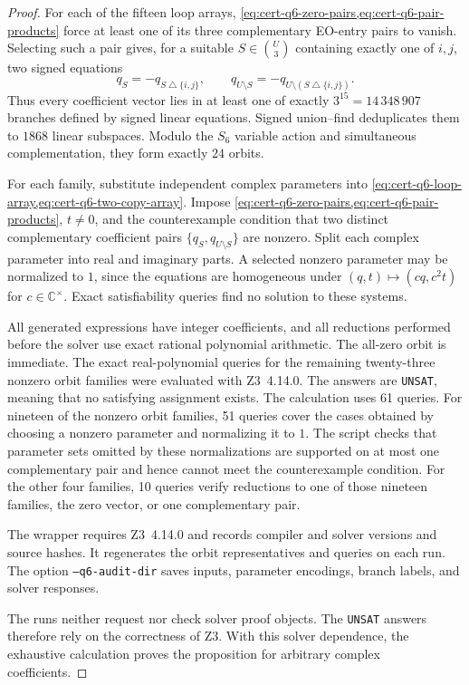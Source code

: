 \documentclass[11pt,letterpaper,onecolumn]{article}
\theoremstyle{plain}
\theoremstyle{definition}
\theoremstyle{remark}
\begin{document}
	\begin{proof}

For each of the fifteen loop arrays,
		\cref{eq:cert-q6-zero-pairs,eq:cert-q6-pair-products} force at least one
		of its three complementary EO-entry pairs to vanish.  Selecting such a
		pair gives, for a suitable \(S\in\binom U3\) containing exactly one of
		\(i,j\), two signed equations
		\begin{equation*}
			q_S=-q_{S\mathbin\triangle\{i,j\}},
			\qquad
			q_{U\setminus S}=-q_{U\setminus(S\mathbin\triangle\{i,j\})}.
		\end{equation*}
		Thus every coefficient vector lies in at least one of exactly
		\(3^{15}=14\,348\,907\) branches defined by signed linear equations.  Signed
		union--find deduplicates them to \(1868\) linear subspaces. Modulo the \(S_6\) variable action
		and simultaneous complementation, they form exactly \(24\) orbits.
		
        For each family, substitute independent complex parameters into
        \cref{eq:cert-q6-loop-array,eq:cert-q6-two-copy-array}. Impose
        \cref{eq:cert-q6-zero-pairs,eq:cert-q6-pair-products}, \(t\ne0\),
        and the counterexample condition that two distinct complementary
        coefficient pairs \(\{q_S,q_{U\setminus S}\}\) are nonzero.
        Split each complex parameter into real and imaginary parts.
        A selected nonzero parameter may be normalized to \(1\), since
        the equations are homogeneous under
        \((q,t)\mapsto(cq,c^2t)\) for \(c\in\mathbb C^\times\).
        Exact satisfiability queries find no solution to these systems.
		
		All generated expressions have integer coefficients, and all reductions
		performed before the solver use exact rational polynomial arithmetic.  The
		all-zero orbit is immediate.
		The exact real-polynomial queries for the remaining twenty-three nonzero
		orbit families were evaluated with Z3~4.14.0.  The answers are
		\texttt{UNSAT}, meaning that no satisfying assignment exists. The
		calculation uses 61 queries. For nineteen of the nonzero orbit families,
		51 queries cover the cases obtained by choosing a nonzero parameter and
		normalizing it to \(1\). The script checks that parameter sets omitted by
		these normalizations are supported on at most one complementary pair and
		hence cannot meet the counterexample condition. For the other four families,
		10 queries verify reductions to one of those nineteen families, the zero
		vector, or one complementary pair.
		
        The wrapper requires Z3~4.14.0 and records compiler and solver
        versions and source hashes. It regenerates the orbit representatives
        and queries on each run. The option \texttt{--q6-audit-dir} saves
        inputs, parameter encodings, branch labels, and solver responses.

		The runs neither request nor check solver proof objects.
		The \texttt{UNSAT} answers therefore rely on the correctness of Z3.
        With this solver dependence, the exhaustive calculation proves the
        proposition for arbitrary complex coefficients.
	\end{proof}
	
\end{document}
